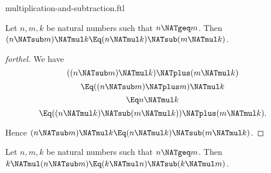 \documentclass{stex}
\begin{document}
\begin{smodule}{multiplication-and-subtraction.ftl}

\begin{proposition}[forthel,id=ARITHMETIC_06_5458841930039296]
  Let $n, m, k$ be natural numbers such that $n \NATgeq m$.
  Then $(n \NATsub m) \NATmul k \Eq (n \NATmul k) \NATsub (m \NATmul k)$.
\end{proposition}
\begin{proof}[forthel]
  We have
  \[  ((n \NATsub m) \NATmul k) \NATplus (m \NATmul k)                 \]
  \[    \Eq ((n \NATsub m) \NATplus m) \NATmul k                       \]
  \[    \Eq n \NATmul k                                   \]
  \[    \Eq ((n \NATmul k) \NATsub (m \NATmul k)) \NATplus (m \NATmul k).  \]

  Hence $(n \NATsub m) \NATmul k \Eq (n \NATmul k) \NATsub (m \NATmul k)$.
\end{proof}

\begin{corollary}[forthel,id=ARITHMETIC_06_8461123277815808]
  Let $n, m, k$ be natural numbers such that $n \NATgeq m$.
  Then $k \NATmul (n \NATsub m) \Eq (k \NATmul n) \NATsub (k \NATmul m)$.
\end{corollary}
\end{smodule}
\end{document}
